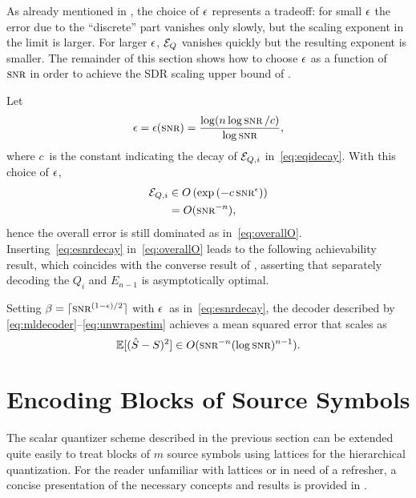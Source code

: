 As already mentioned in , the choice of $\epsilon$ represents a
tradeoff: for small $\epsilon$ the error due to the ``discrete'' part vanishes only
slowly, but the scaling exponent in the limit is larger. For larger $\epsilon$, ${{\mathcal{E}}_Q}$
vanishes quickly but the resulting exponent is smaller. The remainder of this
section shows how to choose $\epsilon$ as a function of~$\snr$ in order to achieve the
SDR scaling upper bound of .

Let
\begin{equation}
  \label{eq:esnrdecay}
  \e = \e(\snr) = \frac{\log(n \log\snr / c)}{\log\snr},
\end{equation}
where $c$~is the constant indicating the decay of ${{\mathcal{E}}_{Q,i}}$ in~\eqref{eq:eqidecay}.
With this choice of $\epsilon$,
\begin{align*}
  \Eqi &\in O\left( \exp\left( - c \snr^\e \right) \right) \\
 &= O(\snr^{-n}),
\end{align*}
hence the overall error is still dominated as in~\eqref{eq:overallO}.
Inserting~\eqref{eq:esnrdecay} in~\eqref{eq:overallO} leads to the following
achievability result, which coincides with the converse result of
, asserting that separately decoding the $Q_i$ and $E_{n-1}$
is asymptotically optimal.
\begin{theorem}
  \label{thm:scalarachievability}
  Setting $\beta = \lceil \snr^{(1-\e)/2} \rceil$ with $\epsilon$~as
  in~\eqref{eq:esnrdecay}, the decoder described by
  \eqref{eq:mldecoder}--\eqref{eq:unwrapestim} achieves a mean squared error
  that scales as
  \begin{equation*}
    \mse \in O(\snr^{-n} (\log\snr)^{n-1}).
  \end{equation*}
\end{theorem}







\section{Encoding Blocks of Source Symbols}\label{sec:latticequant}

The scalar quantizer scheme described in the previous section can be extended
quite easily to treat blocks of $m$ source symbols using lattices for the
hierarchical quantization. For the reader unfamiliar with lattices or in need of
a refresher, a concise presentation of the necessary concepts and results is
provided in .

